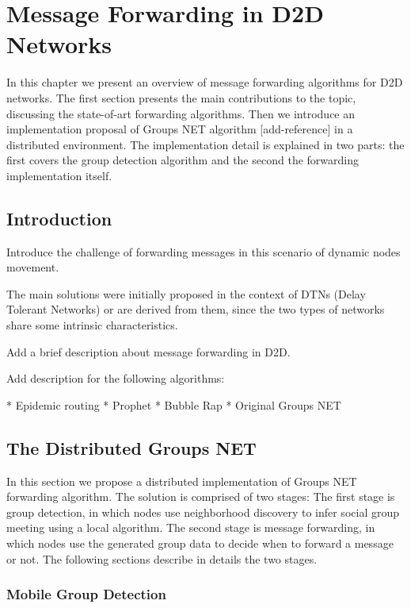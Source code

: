 \chapter{Message Forwarding in D2D Networks}
\label{ch:GroupsNet}

In this chapter we present an overview of message forwarding algorithms for D2D networks. The first section
presents the main contributions to the topic, discussing the state-of-art forwarding algorithms. Then we introduce
an implementation proposal of Groups NET algorithm [add-reference] in a distributed environment.
The implementation detail is explained in two parts: the first covers the group detection algorithm and the
second the forwarding implementation itself.

\section{Introduction}

Introduce the challenge of forwarding messages in this scenario of dynamic nodes movement.

The main solutions were initially proposed in the context of DTNs (Delay Tolerant Networks) or are derived from them,
since the two types of networks share some intrinsic characteristics.

Add a brief description about message forwarding in D2D.

Add description for the following algorithms:

* Epidemic routing
* Prophet
* Bubble Rap
* Original Groups NET

\section{The Distributed Groups NET}

In this section we propose a distributed implementation of Groups NET forwarding algorithm. The solution is
comprised of two stages: The first stage is group detection, in which nodes use neighborhood discovery to
infer social group meeting using a local algorithm. The second stage is message forwarding, in which nodes
use the generated group data to decide when to forward a message or not. The following sections describe in
details the two stages.

\subsection{Mobile Group Detection}

